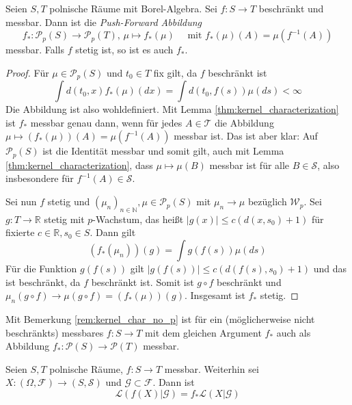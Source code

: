 \begin{lemma}\label{thm:pushforward_measurable}
Seien $S, T$ polnische Räume mit Borel-Algebra. Sei $f:S\rightarrow T$ beschränkt und messbar. Dann ist die \emph{Push-Forward Abbildung} 
$$f_*:\mathcal{P}_p(S)\rightarrow\mathcal{P}_p(T), \, \mu \mapsto f_*(\mu)\quad  \text{ mit } f_*(\mu)(A) = \mu(f^{-1}(A))$$
messbar. Falls $f$ stetig ist, so ist es auch $f_*$.
\end{lemma}
\begin{proof}
Für $\mu \in \mathcal{P}_p(S)$ und $t_0 \in T$ fix gilt, da $f$ beschränkt ist
$$\int d(t_0, x) f_*(\mu)(dx) = \int d(t_0, f(s))\mu(ds) < \infty$$
Die Abbildung ist also wohldefiniert.
Mit Lemma \ref{thm:kernel_characterization} ist $f_*$ messbar genau dann, wenn für jedes $A \in \mathcal{T}$ die Abbildung $\mu \mapsto (f_*(\mu))(A)=\mu(f^{-1}(A))$ messbar ist. Das ist aber klar: Auf $\mathcal{P}_p(S)$ ist die Identität messbar und somit gilt, auch mit Lemma \ref{thm:kernel_characterization}, dass $\mu \mapsto \mu(B)$ messbar ist für alle $B\in \mathcal{S}$, also insbesondere für $f^{-1}(A) \in \mathcal{S}$. 

Sei nun $f$ stetig und $(\mu_n)_{n\in\mathbb{N}}, \mu \in \mathcal{P}_p(S)$ mit $\mu_n\rightarrow \mu$ bezüglich $\mathcal{W}_p$. Sei $g:T\rightarrow \mathbb{R}$ stetig mit $p$-Wachstum, das heißt $|g(x)| \leq c(d(x, s_0)+1)$ für fixierte $c\in\mathbb{R}, s_0\in S$. Dann gilt
    $$(f_*(\mu_n))(g) = \int g(f(s)) \mu(ds)$$
Für die Funktion $g(f(s))$ gilt $|g(f(s))|\leq c(d(f(s), s_0)+1)$ und das ist beschränkt, da $f$ beschränkt ist. Somit ist $g\circ f$ beschränkt und $\mu_n(g\circ f) \rightarrow \mu(g\circ f) = (f_*(\mu))(g)$. Insgesamt ist $f_*$ stetig.
\end{proof}
\begin{remark}
Mit Bemerkung \ref{rem:kernel_char_no_p} ist für ein (möglicherweise nicht beschränkts) messbares $f: S\rightarrow T$ mit dem gleichen Argument $f_*$ auch als Abbildung $f_*: \mathcal{P}(S) \rightarrow \mathcal{P}(T)$ messbar.
\end{remark}
\begin{corollary}\label{thm:pushforward_law}
Seien $S, T$ polnische Räume, $f:S\rightarrow T$ messbar. Weiterhin sei $X:(\Omega, \mathcal{F}) \rightarrow (S, \mathcal{S})$ und $\mathcal{G}\subset\mathcal{F}$. Dann ist 
$$\mathcal{L}(f(X)\vert \mathcal{G}) = f_*\mathcal{L}(X\vert\mathcal{G})$$
\end{corollary}
